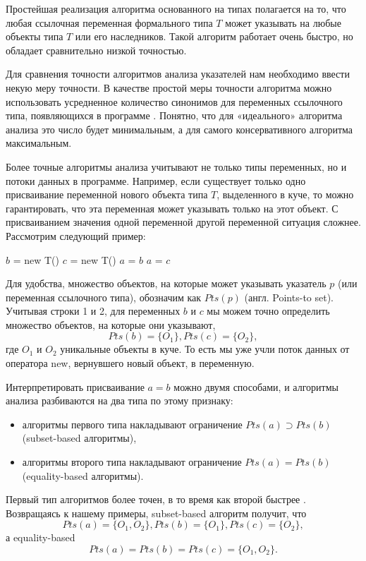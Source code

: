 \documentclass[14pt,titlepage]{extarticle}
\newcommand{\eng}[1]{{\English#1}}
\begin{document}
    Простейшая реализация алгоритма основанного на типах полагается на то, что
    любая ссылочная переменная формального типа $T$ может указывать на любые
    объекты типа $T$ или его наследников. Такой алгоритм работает очень быстро,
    но обладает сравнительно низкой точностью.

    Для сравнения точности алгоритмов анализа указателей нам необходимо ввести
    некую меру точности. В качестве простой меры точности алгоритма можно
    использовать усредненное количество синонимов для переменных ссылочного
    типа, появляющихся в программе \cite{hind_pointer_analysis_not_solved_yet}.
    Понятно, что для «идеального» алгоритма анализа это число будет
    минимальным, а для самого консервативного алгоритма максимальным.

    Более точные алгоритмы анализа учитывают не только типы переменных,
    но и потоки данных в программе. Например, если существует только
    одно присваивание переменной нового объекта типа $T$, выделенного в куче,
    то можно гарантировать, что эта переменная может указывать только
    на этот объект.
    С присваиванием значения одной переменной другой переменной ситуация
    сложнее.
    Рассмотрим следующий пример:
    \begin{algorithmic}[1]
    \STATE $b$ = new T()
    \STATE $c$ = new T()
    \STATE $a$ = $b$
    \STATE $a$ = $c$
    \end{algorithmic}
    Для удобства, множество объектов, на которые может указывать указатель $p$
    (или переменная ссылочного типа), обозначим как $Pts(p)$
    (англ. \eng{Points-to set}).
    Учитывая строки 1 и 2, для переменных $b$ и $c$ мы можем точно определить
    множество объектов, на которые они указывают,
    \[Pts(b) = \{O_1\}, Pts(c) = \{O_2\},\] где $O_1$ и $O_2$ уникальные
    объекты в куче. То есть мы уже учли поток данных от оператора new,
    вернувшего новый объект, в переменную.

    Интерпретировать присваивание $a = b$ можно двумя способами,
    и алгоритмы анализа разбиваются на два типа по этому признаку:
    \begin{itemize}
      \item алгоритмы первого типа накладывают ограничение
            $Pts(a) \supset Pts(b)$ (\eng{subset-based} алгоритмы),
      \item алгоритмы второго типа накладывают ограничение
            $Pts(a) = Pts(b)$ (\eng{equality-based} алгоритмы).
    \end{itemize}
    Первый тип алгоритмов более точен, в то время как второй быстрее
    \cite{steensgaard}. Возвращаясь к нашему примеры, \eng{subset-based}
    алгоритм получит, что
    \[Pts(a) = \{O_1, O_2\}, Pts(b) = \{O_1\}, Pts(c) = \{O_2\},\]
    а \eng{equality-based}
    \[Pts(a) = Pts(b) = Pts(c) = \{O_1, O_2\}.\]
\end{document}
